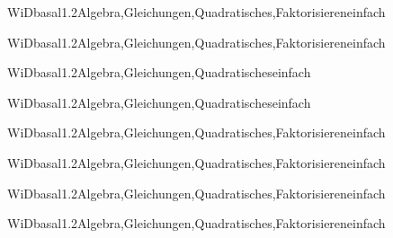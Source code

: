 \documentclass[12pt]{article}
\begin{document}
    \begin{Add}{WiD}{basal1.2}{Algebra,Gleichungen,Quadratisches,Faktorisieren}{einfach}
    \solution{ }
    \end{Add}
    \begin{Add}{WiD}{basal1.2}{Algebra,Gleichungen,Quadratisches,Faktorisieren}{einfach}
    \end{Add}
    

    \begin{Add}{WiD}{basal1.2}{Algebra,Gleichungen,Quadratisches}{einfach}
    \solution{ }
    \end{Add}
    \begin{Add}{WiD}{basal1.2}{Algebra,Gleichungen,Quadratisches}{einfach}
    \end{Add}
    

    \begin{Add}{WiD}{basal1.2}{Algebra,Gleichungen,Quadratisches,Faktorisieren}{einfach}
    \solution{ }
    \end{Add}
    \begin{Add}{WiD}{basal1.2}{Algebra,Gleichungen,Quadratisches,Faktorisieren}{einfach}
    \end{Add}
    

    \begin{Add}{WiD}{basal1.2}{Algebra,Gleichungen,Quadratisches,Faktorisieren}{einfach}
    \solution{ }
    \end{Add}
    \begin{Add}{WiD}{basal1.2}{Algebra,Gleichungen,Quadratisches,Faktorisieren}{einfach}
    \end{Add}
    
\end{document}
